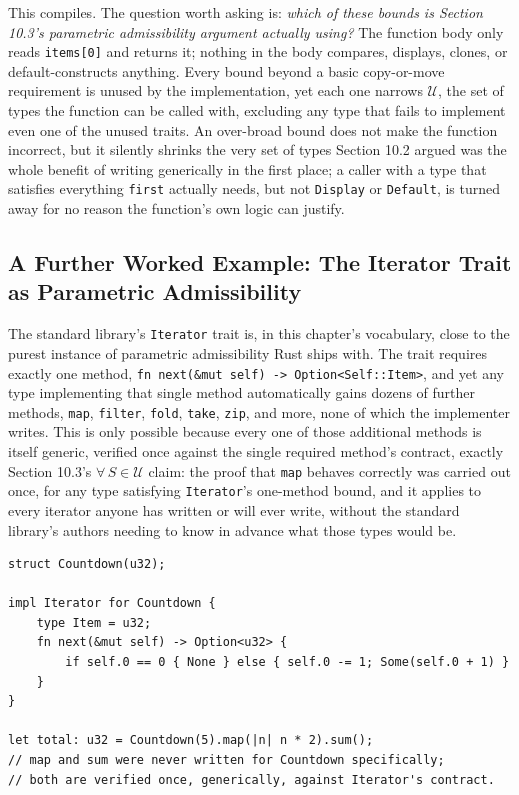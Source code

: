 \documentclass[11pt]{book}
\begin{document}
This compiles. The question worth asking is: \emph{which of these bounds is Section 10.3's parametric admissibility argument actually using?} The function body only reads \texttt{items[0]} and returns it; nothing in the body compares, displays, clones, or default-constructs anything. Every bound beyond a basic copy-or-move requirement is unused by the implementation, yet each one narrows $\mathcal{U}$, the set of types the function can be called with, excluding any type that fails to implement even one of the unused traits. An over-broad bound does not make the function incorrect, but it silently shrinks the very set of types Section 10.2 argued was the whole benefit of writing generically in the first place; a caller with a type that satisfies everything \texttt{first} actually needs, but not \texttt{Display} or \texttt{Default}, is turned away for no reason the function's own logic can justify.

\subsection*{A Further Worked Example: The Iterator Trait as Parametric Admissibility}

The standard library's \texttt{Iterator} trait is, in this chapter's vocabulary, close to the purest instance of parametric admissibility Rust ships with. The trait requires exactly one method, \texttt{fn next(\&mut self) -> Option<Self::Item>}, and yet any type implementing that single method automatically gains dozens of further methods, \texttt{map}, \texttt{filter}, \texttt{fold}, \texttt{take}, \texttt{zip}, and more, none of which the implementer writes. This is only possible because every one of those additional methods is itself generic, verified once against the single required method's contract, exactly Section 10.3's $\forall\, S \in \mathcal{U}$ claim: the proof that \texttt{map} behaves correctly was carried out once, for any type satisfying \texttt{Iterator}'s one-method bound, and it applies to every iterator anyone has written or will ever write, without the standard library's authors needing to know in advance what those types would be.

\begin{lstlisting}
struct Countdown(u32);

impl Iterator for Countdown {
    type Item = u32;
    fn next(&mut self) -> Option<u32> {
        if self.0 == 0 { None } else { self.0 -= 1; Some(self.0 + 1) }
    }
}

let total: u32 = Countdown(5).map(|n| n * 2).sum();
// map and sum were never written for Countdown specifically;
// both are verified once, generically, against Iterator's contract.
\end{lstlisting}
\end{document}
